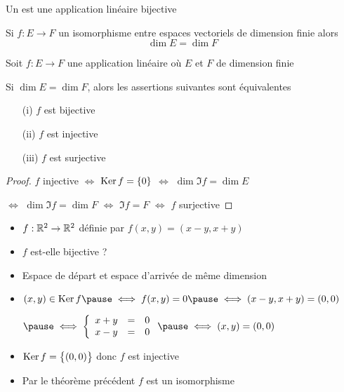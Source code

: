 \begin{frame}

Un  est une application linéaire bijective
\begin{proposition}
Si $f : E \to F$ un isomorphisme entre espaces vectoriels de dimension finie
alors 
\vspace*{-1ex}
$$\dim E =\dim F$$
\end{proposition}

\pause

\begin{theoreme}
\label{th:eqapplinbij}
Soit $f : E \to F$ une application linéaire où $E$ et $F$ 
de dimension finie

Si $\dim E = \dim F$, alors les assertions suivantes sont équivalentes
\pause
\begin{itemize}
  \item[(i)] $f$ est bijective
  \item[(ii)] $f$ est injective
  \item[(iii)] $f$ est surjective
\end{itemize}
\end{theoreme}

\pause

\begin{proof} 
$f$ injective 
\pause
$\iff$ $\mathop{\text{Ker}}\nolimits f = \{0\}$
\pause
$\iff$ $\dim \Im f =\dim E$
\pause

\hfill $\iff$ $\dim \Im f=\dim F$
\pause
$\iff$ $\Im f =F$
\pause
$\iff$ $f$ surjective
\end{proof}


\end{frame}

\begin{frame}
\begin{exemple}
\begin{itemize}
  \item $f : \mathbb{R}^2 \to \mathbb{R}^2$ définie par $f(x,y) = (x-y,x+y)$
  \pause 
  \item $f$ est-elle bijective ?
  \pause 
  \item Espace de départ et espace d'arrivée de même dimension
  \pause 
  \item 
  $(x,y) \in \Ker f \pause \iff f(x,y)=0 \pause \iff (x-y,x+y)=(0,0)$

  $\pause \iff 
\left\{
\begin{array}{rcl}
x+y & = & 0 \\
x-y & = & 0 \\
\end{array}
\right. 
\pause \iff (x,y) = (0,0)$
  \pause 
  \item $\mathop{\text{Ker}}\nolimits f = \big\{(0,0)\big\}$ donc $f$ est injective
  \pause 
  \item Par le théorème précédent $f$ est un isomorphisme
\end{itemize}

\end{exemple}
\end{frame}



